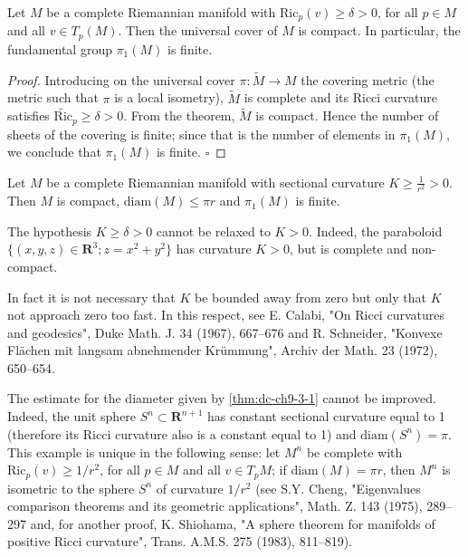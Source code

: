 \begin{corollary}
  \label{cor:dc-ch9-3-2}
  Let $M$ be a complete Riemannian manifold with $\mathrm{Ric}_p(v)\ge\delta>0$, for
  all $p\in M$ and all $v\in T_p(M)$. Then the universal cover of $M$ is compact. In
  particular, the fundamental group $\pi_1(M)$ is finite.
\end{corollary}
\begin{proof}
  Introducing on the universal cover $\pi:\tilde M\to M$ the covering metric
  (the metric such that $\pi$ is a local isometry), $\tilde M$ is complete and its
  Ricci curvature satisfies $\widetilde{\mathrm{Ric}}_p\ge\delta>0$. From the theorem,
  $\tilde M$ is compact. Hence the number of sheets of the covering is finite; since
  that is the number of elements in $\pi_1(M)$, we conclude that $\pi_1(M)$ is
  finite. $\square$
\end{proof}

\begin{corollary}
  \label{cor:dc-ch9-3-3}
  Let $M$ be a complete Riemannian manifold with sectional curvature
  $K\ge\frac{1}{r^2}>0$. Then $M$ is compact, $\mathrm{diam}(M)\le\pi r$ and
  $\pi_1(M)$ is finite.
\end{corollary}

\begin{remark}[Remark 3.4]
  \label{rem:dc-ch9-3-4}
  The hypothesis $K\ge\delta>0$ cannot be relaxed to $K>0$. Indeed, the paraboloid
  $\{(x,y,z)\in\mathbf{R}^3;z=x^2+y^2\}$ has curvature $K>0$, but is complete and
  non-compact.
\end{remark}

\begin{remark}[Remark 3.5]
  \label{rem:dc-ch9-3-5}
  In fact it is not necessary that $K$ be bounded away from zero but only that $K$
  not approach zero too fast. In this respect, see E. Calabi, "On Ricci curvatures
  and geodesics", Duke Math. J. 34 (1967), 667–676 and R. Schneider, "Konvexe
  Flächen mit langsam abnehmender Krümmung", Archiv der Math. 23 (1972), 650–654.
\end{remark}

\begin{remark}[Remark 3.6]
  \label{rem:dc-ch9-3-6}
  The estimate for the diameter given by \cref{thm:dc-ch9-3-1} cannot be improved. Indeed, the
  unit sphere $S^n\subset\mathbf{R}^{n+1}$ has constant sectional curvature equal to
  1 (therefore its Ricci curvature also is a constant equal to 1) and
  $\mathrm{diam}(S^n)=\pi$. This example is unique in the following sense: let $M^n$
  be complete with $\mathrm{Ric}_p(v)\ge 1/r^2$, for all $p\in M$ and all $v\in T_pM$;
  if $\mathrm{diam}(M)=\pi r$, then $M^n$ is isometric to the sphere $S^n$ of
  curvature $1/r^2$ (see S.Y. Cheng, "Eigenvalues comparison theorems and its
  geometric applications", Math. Z. 143 (1975), 289–297 and, for another proof, K.
  Shiohama, "A sphere theorem for manifolds of positive Ricci curvature", Trans.
  A.M.S. 275 (1983), 811–819).
\end{remark}

